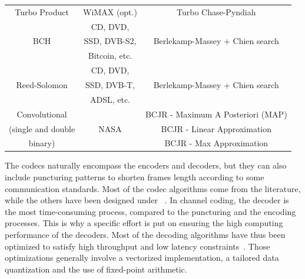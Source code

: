 \begin{table}
\begin{tabular}{ c | c | c }
  \hline
  \multirow{2}{*}{{Turbo Product}}         & \multirow{2}{*}{WiMAX (opt.)}       & \multirow{2}{*}{Turbo Chase-Pyndiah}   \\
                                           &                                     &                                        \\
  \hline
  \multirow{3}{*}{{BCH}}                   & CD, DVD,                            &                                        \\
                                           & SSD, DVB-S2,                        & Berlekamp-Massey + Chien search        \\
                                           & Bitcoin, etc.                       &                                        \\
  \hline
  \multirow{3}{*}{{Reed-Solomon}}          & CD, DVD,                            &                                        \\
                                           & SSD, DVB-T,                         & Berlekamp-Massey + Chien search        \\
                                           & ADSL, etc.                          &                                        \\
  \hline
  \multirow{1}{*}{{Convolutional}}         &                                     & BCJR - Maximum A Posteriori (MAP)      \\
  (single and double                       & NASA                                & BCJR - Linear Approximation            \\
  binary)                                  &                                     & BCJR - Max Approximation               \\
  \end{tabular}
\end{table}

The codecs naturally encompass the encoders and decoders, but they can also
include puncturing patterns to shorten frames length according to some
communication standards. Most of the codec algorithms come from the literature,
while the others have been designed under
\AFFECT~\cite{Tonnellier2016a,Tonnellier2016b,Tonnellier2017,Leonardon2019}.
In channel coding, the decoder is the most time-consuming process, compared to
the puncturing and the encoding processes. This is why a specific effort is put
on ensuring the high computing performance of the decoders. Most of the decoding
algorithms have thus been optimized to satisfy high throughput and low latency
constraints~\cite{LeGal2015a,Cassagne2015c,Cassagne2016a,Cassagne2016b}. Those
optimizations generally involve a vectorized implementation, a tailored data
quantization and the use of fixed-point arithmetic.

